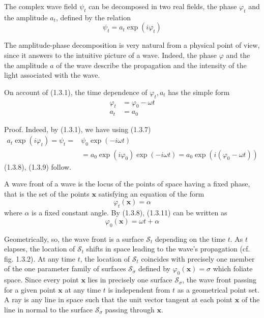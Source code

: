 \documentclass{article}
\begin{document}
The complex wave field $\psi_{t}$ can be decomposed in two real fields, the phase $\varphi_{t}$ and the amplitude $a_{t}$, defined by the relation
$$
\begin{equation*}
\psi_{t}=a_{t} \exp \left(i \varphi_{t}\right) \tag{1.3.7}
\end{equation*}
$$

The amplitude-phase decomposition is very natural from a physical point of view, since it answers to the intuitive picture of a wave. Indeed, the phase $\varphi$ and the the amplitude $a$ of the wave describe the propagation and the intensity of the light associated with the wave.

On account of (1.3.1), the time dependence of $\varphi_{t}, a_{t}$ has the simple form
$$
\begin{align*}
\varphi_{t} & =\varphi_{0}-\omega t  \tag{1.3.8}\\
a_{t} & =a_{0} \tag{1.3.9}
\end{align*}
$$

Proof. Indeed, by (1.3.1), we have using (1.3.7)
$$
\begin{align*}
a_{t} \exp \left(i \varphi_{t}\right)=\psi_{t}= & \psi_{0} \exp (-i \omega t)  \tag{1.3.10}\\
& =a_{0} \exp \left(i \varphi_{0}\right) \exp (-i \omega t)=a_{0} \exp \left(i\left(\varphi_{0}-\omega t\right)\right)
\end{align*}
$$
(1.3.8), (1.3.9) follow.

A wave front of a wave is the locus of the points of space having a fixed phase, that is the set of the points $\boldsymbol{x}$ satisfying an equation of the form
$$
\begin{equation*}
\varphi_{t}(\boldsymbol{x})=\alpha \tag{1.3.11}
\end{equation*}
$$
where $\alpha$ is a fixed constant angle. By (1.3.8), (1.3.11) can be written as
$$
\begin{equation*}
\varphi_{0}(\boldsymbol{x})=\omega t+\alpha \tag{1.3.12}
\end{equation*}
$$

Geometrically, so, the wave front is a surface $\mathcal{S}_{t}$ depending on the time $t$. As $t$ elapses, the location of $\mathcal{S}_{t}$ shifts in space leading to the wave's propagation (cf. fig. 1.3.2). At any time $t$, the location of $\mathcal{S}_{t}$ coincides with precisely one member of the one parameter family of surfaces $\mathcal{S}_{\sigma}$ defined by $\varphi_{0}(\boldsymbol{x})=\sigma$ which foliate space. Since every point $\boldsymbol{x}$ lies in precisely one surface $\mathcal{S}_{\sigma}$, the wave front passing for a given point $\boldsymbol{x}$ at any time $t$ is independent from $t$ as a geometrical point set. A ray is any line in space such that the unit vector tangent at each point $\boldsymbol{x}$ of the line in normal to the surface $\mathcal{S}_{\sigma}$ passing through $\boldsymbol{x}$.
\end{document}
